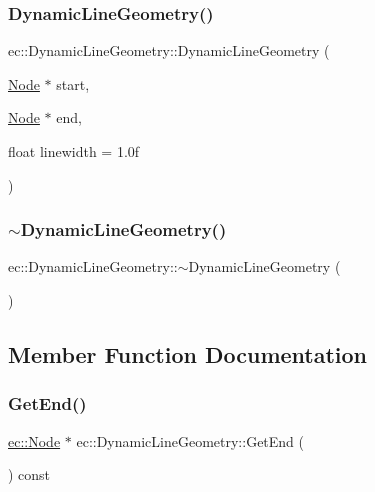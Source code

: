 \subsubsection{\texorpdfstring{Dynamic\+Line\+Geometry()}{DynamicLineGeometry()}}
{\footnotesize\ttfamily ec\+::\+Dynamic\+Line\+Geometry\+::\+Dynamic\+Line\+Geometry (\begin{DoxyParamCaption}\item[{\mbox{\hyperlink{classec_1_1_node}{Node}} $\ast$}]{start,  }\item[{\mbox{\hyperlink{classec_1_1_node}{Node}} $\ast$}]{end,  }\item[{float}]{linewidth = {\ttfamily 1.0f} }\end{DoxyParamCaption})\hspace{0.3cm}{\ttfamily [explicit]}}

\mbox{\label{classec_1_1_dynamic_line_geometry_aee42706b172e0e76cd290a4ae6897740}} 
\subsubsection{\texorpdfstring{$\sim$\+Dynamic\+Line\+Geometry()}{~DynamicLineGeometry()}}
{\footnotesize\ttfamily ec\+::\+Dynamic\+Line\+Geometry\+::$\sim$\+Dynamic\+Line\+Geometry (\begin{DoxyParamCaption}{ }\end{DoxyParamCaption})}



\subsection{Member Function Documentation}
\mbox{\label{classec_1_1_dynamic_line_geometry_a02b0da9617828219e6e6f8a9fe4331e7}} 
\subsubsection{\texorpdfstring{Get\+End()}{GetEnd()}}
{\footnotesize\ttfamily \mbox{\hyperlink{classec_1_1_node}{ec\+::\+Node}} $\ast$ ec\+::\+Dynamic\+Line\+Geometry\+::\+Get\+End (\begin{DoxyParamCaption}{ }\end{DoxyParamCaption}) const}

